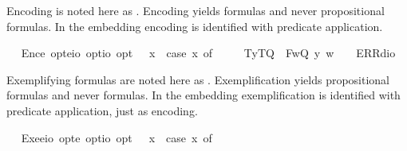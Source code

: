 \begin{isabellebody}
\begin{isamarkuptext}
  Encoding  is noted here as . 
  Encoding yields formulas and never propositional formulas. In the embedding encoding 
  is identified with predicate application.%
\end{isamarkuptext}%
\isamarkuptrue%
\ \isamarkupfalse%
\ Enc{\isacharcolon}{\isacharcolon}{\isachardoublequoteopen}e\ opt{\isasymRightarrow}{\isacharparenleft}e{\isasymRightarrow}io{\isacharparenright}\ opt{\isasymRightarrow}io\ opt{\isachardoublequoteclose}\ {\isacharparenleft}{\isachardoublequoteopen}{\isasymlbrace}{\isacharunderscore}{\isacharcomma}{\isacharunderscore}{\isasymrbrace}{\isachardoublequoteclose}{\isacharparenright}\ \ {\isachardoublequoteopen}{\isasymlbrace}x{\isacharcomma}{\isasymPhi}{\isasymrbrace}\ {\isasymequiv}\ case\ {\isacharparenleft}x{\isacharcomma}{\isasymPhi}{\isacharparenright}\ of\ \isanewline
\ \ \ \ {\isacharparenleft}T{\isacharparenleft}y{\isacharparenright}{\isacharcomma}T{\isacharparenleft}Q{\isacharparenright}{\isacharparenright}\ {\isasymRightarrow}\ F{\isacharparenleft}{\isasymlambda}w{\isachardot}{\isacharparenleft}Q\ y{\isacharparenright}\ w{\isacharparenright}\ {\isacharbar}\ {\isacharunderscore}\ {\isasymRightarrow}\ ERR{\isacharparenleft}dio{\isacharparenright}{\isachardoublequoteclose}%
\begin{isamarkuptext}%
Exemplifying formulas  are noted here as .  
  Exemplification yields propositional formulas and never formulas. In the embedding exemplification 
  is identified with predicate application, just as encoding.%
\end{isamarkuptext}%
\isamarkuptrue%
\ \isamarkupfalse%
\ Exe{}{\isacharcolon}{\isacharcolon}{\isachardoublequoteopen}{\isacharparenleft}e{\isasymRightarrow}io{\isacharparenright}\ opt{\isasymRightarrow}e\ opt{\isasymRightarrow}io\ opt{\isachardoublequoteclose}\ {\isacharparenleft}{\isachardoublequoteopen}{\isasymlparr}{\isacharunderscore}{\isacharcomma}{\isacharunderscore}{\isasymrparr}{\isachardoublequoteclose}{\isacharparenright}\ \ {\isachardoublequoteopen}{\isasymlparr}{\isasymPhi}{\isacharcomma}x{\isasymrparr}\ {\isasymequiv}\ case\ {\isacharparenleft}{\isasymPhi}{\isacharcomma}x{\isacharparenright}\ of\ \isanewline

\end{isabellebody}
